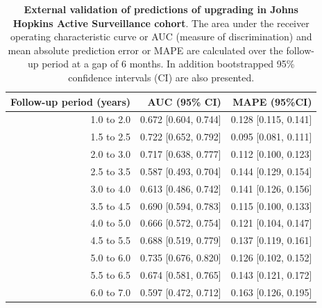 \begin{subappendices}
\begin{table}
\small
\centering
\caption{\textbf{External validation of predictions of upgrading in Johns Hopkins Active Surveillance cohort}. The area under the receiver operating characteristic curve or AUC (measure of discrimination) and mean absolute prediction error or MAPE are calculated over the follow-up period at a gap of 6 months. In addition bootstrapped 95\% confidence intervals (CI) are also presented.}
\label{c5:tab:AUC_PE_Hopkins}
\begin{tabular}{r|r|r}
\hline
\hline
Follow-up period (years) & AUC (95\% CI) & MAPE (95\%CI)\\ 
\hline
1.0 to 2.0 & 0.672 [0.604, 0.744] & 0.128 [0.115, 0.141]\\
1.5 to 2.5 & 0.722 [0.652, 0.792] & 0.095 [0.081, 0.111]\\
2.0 to 3.0 & 0.717 [0.638, 0.777] & 0.112 [0.100, 0.123]\\
2.5 to 3.5 & 0.587 [0.493, 0.704] & 0.144 [0.129, 0.154]\\
3.0 to 4.0 & 0.613 [0.486, 0.742] & 0.141 [0.126, 0.156]\\
3.5 to 4.5 & 0.690 [0.594, 0.783] & 0.115 [0.100, 0.133]\\
4.0 to 5.0 & 0.666 [0.572, 0.754] & 0.121 [0.104, 0.147]\\
4.5 to 5.5 & 0.688 [0.519, 0.779] & 0.137 [0.119, 0.161]\\
5.0 to 6.0 & 0.735 [0.676, 0.820] & 0.126 [0.102, 0.152]\\
5.5 to 6.5 & 0.674 [0.581, 0.765] & 0.143 [0.121, 0.172]\\
6.0 to 7.0 & 0.597 [0.472, 0.712] & 0.163 [0.126, 0.195]\\
\hline
\end{tabular}    
\end{table}


\end{subappendices}
